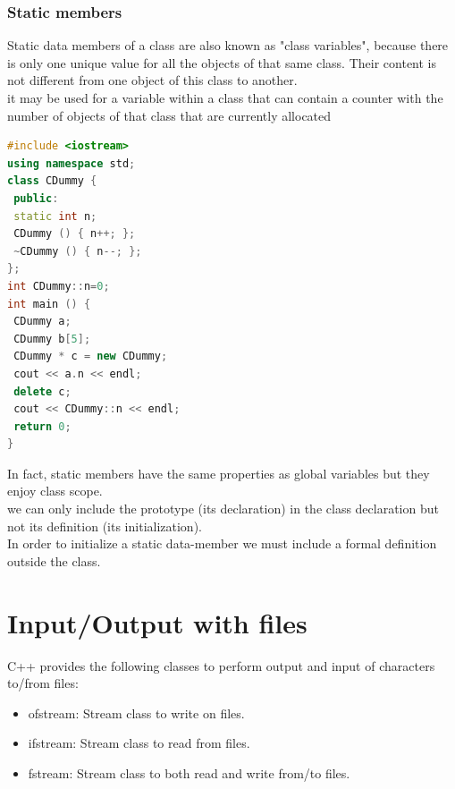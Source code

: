 \documentclass[12pt,oneside]{book}
\begin{document}
\subsection{Static members }
Static data members of a class are also known as "class variables", because there is only one unique value for all the objects of that same class. Their content is not different from one object of this class to another. \\
it may be used for a variable within a class that can contain a counter with the number of objects of that class that are currently allocated
	\begin{lstlisting}[language=C++]
#include <iostream>
using namespace std; 
class CDummy { 
 public: 
 static int n; 
 CDummy () { n++; }; 
 ~CDummy () { n--; }; 
}; 
int CDummy::n=0; 
int main () { 
 CDummy a; 
 CDummy b[5]; 
 CDummy * c = new CDummy; 
 cout << a.n << endl; 
 delete c; 
 cout << CDummy::n << endl; 
 return 0; 
} 
\end{lstlisting}
In fact, static members have the same properties as global variables but they enjoy class scope.\\
we can only include the prototype (its declaration) in the class declaration but not its definition (its initialization).\\
In order to initialize a static data-member we must include a formal definition outside the class.
\chapter{Input/Output with files}
C++ provides the following classes to perform output and input of characters to/from files:
\begin{itemize}
	\item ofstream: Stream class to write on files.
	\item ifstream: Stream class to read from files.
	\item fstream: Stream class to both read and write from/to files.
\end{itemize}
\end{document}
